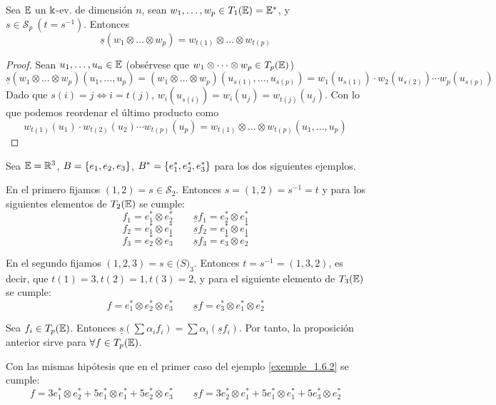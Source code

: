\begin{prop}
    Sea $\mathbb{E}$ un $\Bbbk$-ev. de dimensión $n$, sean $w_1, \dots, w_p \in T_1(\mathbb{E}) = \mathbb{E}^\ast$,
    y $s \in \mathcal{S}_p \ (t = s^{-1})$. Entonces
    \[\underline{s}(w_1 \otimes \dots \otimes w_p) = w_{t(1)}
    \otimes \dots \otimes w_{t(p)}\]
\end{prop}
\begin{proof}
    Sean $u_1, \dots, u_n \in \mathbb{E}$ (obsérvese que $w_1 \otimes \dots \otimes w_p \in T_p(\mathbb{E})$)
    \[\underline{s}(w_1 \otimes \dots \otimes w_p)(u_1,\dots, u_p) = (w_1 \otimes
    \dots \otimes w_p)(u_{s(1)}, \dots, u_{s(p)}) = w_1(u_{s(1)}) \cdot w_2(u_{s(2)})
    \cdots w_p(u_{s(p)})\]
    Dado que $s(i) = j \iff i = t(j)$, $w_i(u_{s(i)}) = w_i(u_j) = w_{t(j)}(u_j)$. Con lo
    que podemos reordenar el último producto como
    \[w_{t(1)}(u_1) \cdot w_{t(2)}(u_2) \cdots w_{t(p)}(u_p) =w_{t(1)}
    \otimes \dots \otimes w_{t(p)}(u_1,\dots, u_p)\]
\end{proof}
\begin{example}
    \label{exemple_1.6.2}
    Sea $\mathbb{E}=\mathbb{R}^3$, $B = \left\{e_1,e_2,e_3\right\}$, $B^\ast =
    \left\{e_1^\ast, e_2^\ast, e_3^\ast\right\}$ para los dos siguientes ejemplos.

    En el primero fijamos $(1,2) = s \in \mathcal{S}_2$. Entonces
    $s = (1,2) = s^{-1}=t$ y para los siguientes elementos de $T_2(\mathbb{E})$ se cumple:
    \[f_1=e_1^\ast \otimes e_2^\ast \qquad \underline{s} f_1 = e_2^\ast \otimes
    e_1^\ast\]
    \[f_2=e_1^\ast \otimes e_1^\ast \qquad \underline{s} f_2 = e_1^\ast \otimes
    e_1^\ast\]
    \[f_3=e_2^\ast \otimes e_3^\ast \qquad \underline{s} f_3 = e_3^\ast \otimes
    e_2^\ast\]

    En el segundo fijamos $(1,2,3) = s \in \mathcal(S)_3$. Entonces $t = s^{-1} =
    (1, 3, 2)$, es decir, que $t(1) = 3, t(2) = 1, t(3) = 2$, y para el siguiente
    elemento de $T_3(\mathbb{E})$ se cumple:
    \[f = e_1^\ast \otimes e_2^\ast \otimes e_3^\ast \qquad
    \underline{s} f =  e_3^\ast \otimes e_1^\ast \otimes e_2^\ast\]
\end{example}
\begin{obs}
\label{obs_1.6.1}
    Sea $f_i \in T_p(\mathbb{E})$. Entonces $\underline{s}(\sum \alpha_i f_i) = \sum \alpha_i
    (\underline{s} f_i)$.
    Por tanto, la proposición anterior sirve para $\forall f \in T_p(\mathbb{E})$.
\end{obs}
\begin{example}
    Con las mismas hipótesis que en el primer caso del ejemplo \ref{exemple_1.6.2}
    se cumple:
    \[f = 3e_1^\ast \otimes e_2^\ast + 5e_1^\ast \otimes e_1^\ast + 5e_2^\ast \otimes
    e_3^\ast \qquad \underline{s}f = 3e_2^\ast \otimes e_1^\ast + 5e_1^\ast \otimes e_1^\ast
    + 5e_3^\ast \otimes e_2^\ast\]
\end{example}
